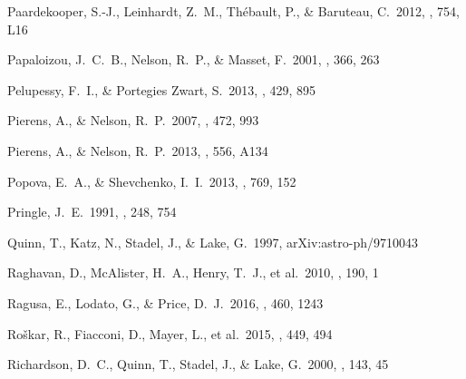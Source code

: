 
 Paardekooper, S.-J., Leinhardt, Z.~M., Th{\'e}bault, P., \& Baruteau, C.\ 2012, \apjl, 754, L16


 Papaloizou, J.~C.~B., Nelson, R.~P., \& Masset, F.\ 2001, \aap, 366, 263


 Pelupessy, F.~I., \& Portegies Zwart, S.\ 2013, \mnras, 429, 895


 Pierens, A., \& Nelson, R.~P.\ 2007, \aap, 472, 993


 Pierens, A., \& Nelson, R.~P.\ 2013, \aap, 556, A134


 Popova, E.~A., \& Shevchenko, I.~I.\ 2013, \apj, 769, 152


 Pringle, J.~E.\ 1991, \mnras, 248, 754

 Quinn, T., Katz, N., Stadel, J., \& Lake, G.\ 1997, arXiv:astro-ph/9710043


 Raghavan, D., McAlister, H.~A., Henry, T.~J., et al.\ 2010, \apjs, 190, 1


 Ragusa, E., Lodato, G., \& Price, D.~J.\ 2016, \mnras, 460, 1243

 Ro{\v s}kar, R., Fiacconi, D., Mayer, L., et al.\ 2015, \mnras, 449, 494


 Richardson, D.~C., Quinn, T., Stadel, J., \& Lake, G.\ 2000, \icarus, 143, 45


